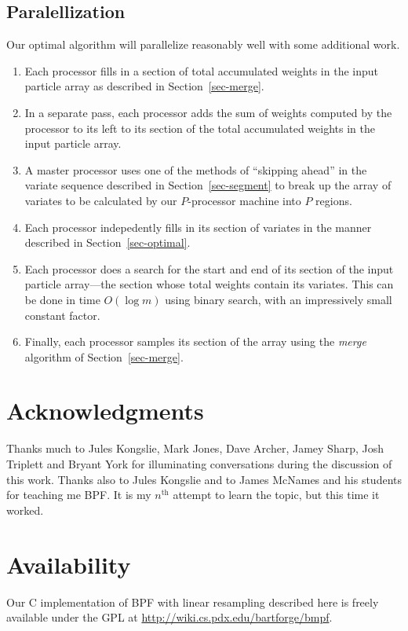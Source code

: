 \documentclass[12pt]{article}
\begin{document}
\subsection{Paralellization}\label{sec-parallel}

  Our optimal algorithm will parallelize reasonably well
  with some additional work. 
  \begin{enumerate}
  \item Each processor fills in a section of total
    accumulated weights in the input particle array as
    described in Section~\ref{sec-merge}.
  \item In a separate pass, each processor adds the sum of
    weights computed by the processor to its left to its
    section of the total accumulated weights in the input
    particle array.
  \item A master processor uses one of the methods of
    ``skipping ahead'' in the variate
    sequence described in Section~\ref{sec-segment} to break up the
    array of variates to be calculated by our $P$-processor
    machine into $P$ regions.
  \item Each processor indepedently fills in its section
    of variates in the manner described in Section~\ref{sec-optimal}.
  \item Each processor does a search for the start and end
    of its section of the input particle array---the section
    whose total weights contain its variates.  This can be done in time
    $O(\log m)$ using binary search, with an impressively
    small constant factor.
  \item Finally, each processor samples its section of the array
    using the {\em merge} algorithm of Section~\ref{sec-merge}.
  \end{enumerate}
  

\section*{Acknowledgments}

  Thanks much to Jules Kongslie, Mark Jones, Dave Archer,
  Jamey Sharp, Josh Triplett and Bryant York for
  illuminating conversations during the discussion of this
  work.  Thanks also to Jules Kongslie and to James McNames
  and his students for teaching me BPF.  It is my
  $n^{\text{th}}$ attempt to learn the topic, but this
  time it worked.

\section*{Availability}

  Our C implementation of BPF with linear resampling
  described here is freely available under the GPL at
  \url{http://wiki.cs.pdx.edu/bartforge/bmpf}.



\end{document}
